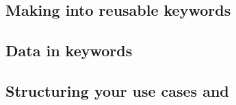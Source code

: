 

\subsection{Making \gdcases{} into reusable keywords}

\label{BPKeywordDesign}

\subsection{Data in keywords}
\label{BPKeywordData}


\subsection{Structuring your use cases and \gdsuites{}}
\label{BPKeywordSuites}

